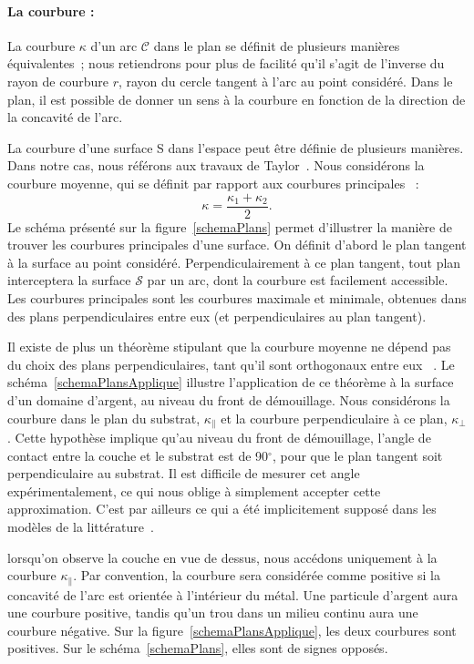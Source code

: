 {{\paragraph*{La courbure :} La courbure $\kappa$ d’un arc $\mathcal{C}$ dans le plan se définit de plusieurs manières équivalentes~; nous retiendrons pour plus de facilité qu’il s’agit de l’inverse du rayon de courbure $r$, rayon du cercle tangent à l’arc au point considéré. Dans le plan, il est possible de donner un sens à la courbure en fonction de la direction de la concavité de l’arc.\par 
La courbure d’une surface S dans l’espace peut être définie de plusieurs manières. Dans notre cas, nous référons aux travaux de Taylor~\cite{taylor1992ii}. Nous considérons la courbure moyenne, qui se définit par rapport aux \og courbures principales \fg~:
\begin{equation}
\kappa = \dfrac{\kappa_1+\kappa_2}{2}.
\label{eCourb}
\end{equation}
Le schéma présenté sur la figure~\ref{schemaPlans} permet d’illustrer la manière de trouver les courbures principales d’une surface. On définit d’abord le plan tangent à la surface au point considéré. Perpendiculairement à ce plan tangent, tout plan interceptera la surface $\mathcal{S}$ par un arc, dont la courbure est facilement accessible. Les courbures principales sont les courbures maximale et minimale, obtenues dans des plans perpendiculaires entre eux (et perpendiculaires au plan tangent).\par
Il existe de plus un théorème stipulant que la courbure moyenne ne dépend pas du choix des plans perpendiculaires, tant qu’il sont orthogonaux entre eux ~\cite{taylor1992ii}. Le schéma~\ref{schemaPlansApplique} illustre l’application de ce théorème à la surface d'un domaine d’argent, au niveau du front de démouillage. Nous considérons la courbure dans le plan du substrat, $\kappa_\parallel$ et la courbure perpendiculaire à ce plan, $\kappa_\perp$. Cette hypothèse implique qu’au niveau du front de démouillage, l’angle de contact entre la couche et le substrat est de 90$^\circ$, pour que le plan tangent soit perpendiculaire au substrat. Il est difficile de mesurer cet angle expérimentalement, ce qui nous oblige à simplement accepter cette approximation. C’est par ailleurs ce qui a été implicitement supposé dans les modèles de la littérature~\cite{brandon1966mobility, jiran1990capillary}.\par 
lorsqu’on observe la couche en vue de dessus, nous accédons uniquement à la courbure $\kappa_\parallel$. Par convention, la courbure sera considérée comme positive si la concavité de l’arc est orientée à l’intérieur du métal. Une particule d’argent aura une courbure positive, tandis qu’un trou dans un milieu continu aura une courbure négative. Sur la figure~\ref{schemaPlansApplique}, les deux courbures sont positives. Sur le schéma~\ref{schemaPlans}, elles sont de signes opposés.\par 

}}
